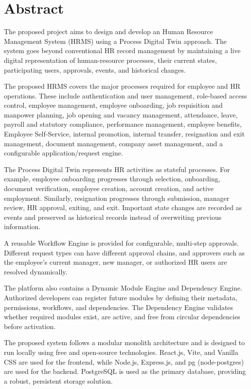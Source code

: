 \documentclass[12pt,a4paper]{article}
\begin{document}
\section*{Abstract}

The proposed project aims to design and develop an Human
Resource Management System (HRMS) using a Process Digital Twin
approach. The system goes beyond conventional HR record management
by maintaining a live digital representation of human-resource
processes, their current states, participating users, approvals,
events, and historical changes.

The proposed HRMS covers the major processes required for
employee and HR operations. These include authentication and user
management, role-based access control, employee management,
employee onboarding, job requisition and manpower planning, job
opening and vacancy management, attendance, leave, payroll and
statutory compliance, performance management, employee benefits,
Employee Self-Service, internal promotion, internal transfer,
resignation and exit management, document management, company
asset management, and a configurable application/request engine.

The Process Digital Twin represents HR activities as stateful
processes. For example, employee onboarding progresses through
selection, onboarding, document verification, employee creation,
account creation, and active employment. Similarly, resignation
progresses through submission, manager review, HR approval, exiting,
and exit. Important state changes are recorded as events and
preserved as historical records instead of overwriting previous
information.

A reusable Workflow Engine is provided for configurable,
multi-step approvals. Different request types can have different
approval chains, and approvers such as the employee's current
manager, new manager, or authorized HR users are resolved
dynamically.

The platform also contains a Dynamic Module Engine and Dependency
Engine. Authorized developers can register future modules by
defining their metadata, permissions, workflows, and dependencies.
The Dependency Engine validates whether required modules exist,
are active, and free from circular dependencies
before activation.

The proposed system follows a modular monolith architecture and is
designed to run locally using free and open-source technologies.
React.js, Vite, and Vanilla CSS are used for the frontend,
while Node.js, Express.js, and pg (node-postgres) are used
for the backend. PostgreSQL is used as the primary database,
providing a robust, persistent storage solution.
\end{document}
